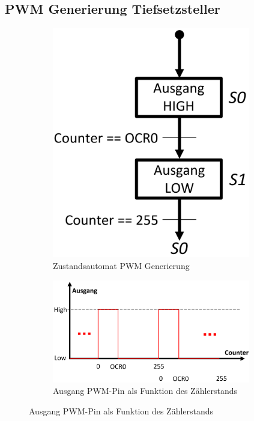 \documentclass[a4paper, 11pt]{report}
\begin{document}
\subsection{PWM Generierung Tiefsetzsteller}
\begin{figure}[htp]
	\centering
	\begin{subfigure}{0.34\textwidth}
		\centering
		\includegraphics[width=0.95\textwidth]{rec/zustandsautomatPWM.png}
		\caption{Zustandsautomat PWM Generierung}
		\label{fig:PWMGENAut}
	\end{subfigure}
	\begin{subfigure}{0.64\textwidth}
		\centering
		\includegraphics[width=0.95\textwidth]{rec/graphPWM.png}
		\caption{Ausgang PWM-Pin als Funktion des Zählerstands}
		\label{fig:PWMGENFX}
	\end{subfigure}


\end{figure}
\end{document}
